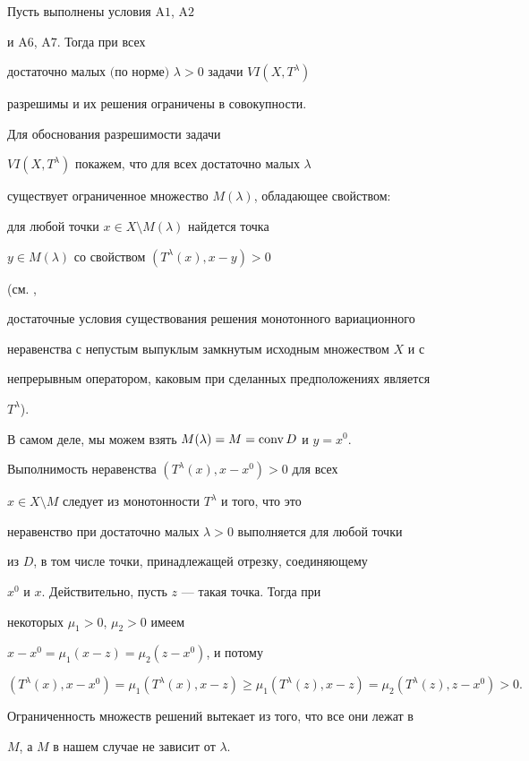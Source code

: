 \begin{thm}


Пусть выполнены условия $\mathrm A 1$, $\mathrm A 2$


и $\mathrm A6$, $\mathrm A7$. Тогда при всех


достаточно малых $($по норме$)$ $\lambda>0$ задачи $VI (X,T^{\lambda})$


разрешимы и их решения ограничены в совокупности.


\end{thm}





\begin{pf} Для обоснования разрешимости задачи


$VI (X,T^{\lambda})$ покажем, что для всех достаточно малых $\lambda$


существует ограниченное множество $M(\lambda)$, обладающее свойством:


для любой точки $x\in X\setminus M(\lambda)$ найдется точка


$y\in M(\lambda)$ со свойством $(T^\lambda (x), x-y)>0$


(см. \cite{12},


достаточные условия существования решения монотонного вариационного


неравенства с непустым выпуклым замкнутым исходным множеством $X$ и с


непрерывным оператором, каковым при сделанных предположениях является


$T^\lambda$).





В самом деле, мы можем взять $M(\lambda)=M=\operatorname{conv} D$ и $y=x^0$.


Выполнимость неравенства $(T^\lambda (x), x-x^0)>0$ для всех


$x\in X\setminus M$ следует из монотонности $T^\lambda$ и того, что это


неравенство при достаточно малых $\lambda>0$ выполняется для любой точки


из $D$, в том числе точки, принадлежащей отрезку, соединяющему


$x^0$ и $x$. Действительно, пусть $z$ --- такая точка. Тогда при


некоторых $\mu_1>0$, $\mu_2>0$ имеем


$x-x^0= \mu_1(x-z)=\mu_2(z-x^0)$, и потому


$$


(T^\lambda (x), x-x^0)=\mu_1(T^\lambda (x), x-z)\ge


\mu_1 (T^\lambda (z), x-z)=\mu_2 (T^\lambda (z), z-x^0)>0.


$$


Ограниченность множеств решений вытекает из того, что все они лежат в


$M$, а $M$ в нашем случае не зависит от $\lambda$.


\end{pf}





